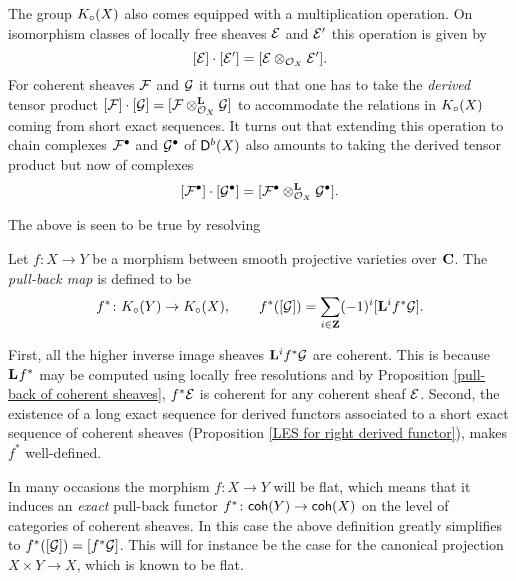 The group $K_{\circ}(X)$ also comes equipped with a multiplication operation. On isomorphism classes of locally free sheaves $\mathcal E$ and $\mathcal E'$ this operation is given by
\[
    [\mathcal E]\cdot[\mathcal E'] = [\mathcal E \otimes_{{\mathcal{O}_{X}}} \mathcal E'].
\]
For coherent sheaves $\mathcal F$ and $\mathcal G$ it turns out that one has to take the \emph{derived} tensor product $[\mathcal F]\cdot[\mathcal G] = [\mathcal F \otimes_{{\mathcal{O}_{X}}}^{\mathbf{L}} \mathcal G]$ to accommodate the relations in $K_{\circ}(X)$ coming from short exact sequences. It turns out that extending this operation to chain complexes $\mathcal F^\bullet$ and $\mathcal G^\bullet$ of $\mathsf{D}^b(X)$ also amounts to taking the derived tensor product but now of complexes
\begin{equation}
    \label{eq: K-theory product compatibility}
    [\F^\bullet]\cdot [\G^\bullet] = [\derivedtensor{\F^\bullet}{\G^\bullet}{\struct{X}}].
\end{equation}

\begin{remark}
    The above is seen to be true by resolving 
\end{remark}

\begin{definition}
    Let $f \colon X \to Y$ be a morphism between smooth projective varieties over $\mathbf C$. The \emph{pull-back map} is defined to be
    \[
        f^* \colon K_{\circ}(Y) \to K_{\circ}(X), \qquad f^*([\mathcal G]) = \sum_{i \in \mathbf Z}(-1)^i[\mathbf{L}^{i}f^*\mathcal G].
    \]
\end{definition}

\begin{remark}
    First, all the higher inverse image sheaves $\mathbf{L}^{i}f^*\mathcal G$ are coherent. This is because $\mathbf{L}^{}f^*$ may be computed using locally free resolutions and by Proposition \ref{pull-back of coherent sheaves}, $f^*\mathcal E$ is coherent for any coherent sheaf $\mathcal E$. Second, the existence of a long exact sequence for derived functors associated to a short exact sequence of coherent sheaves (Proposition \ref{LES for right derived functor}), makes $f^*$ well-defined.    
    
    In many occasions the morphism $f \colon X \to Y$ will be flat, which means that it induces an \emph{exact} pull-back functor $f^* \colon \mathsf{coh}(Y) \to \mathsf{coh}(X)$ on the level of categories of coherent sheaves. In this case the above definition greatly simplifies to $f^*([\mathcal G]) = [f^*\mathcal G]$. This will for instance be the case for the canonical projection $X \times Y \to X$, which is known to be flat.  
\end{remark}

